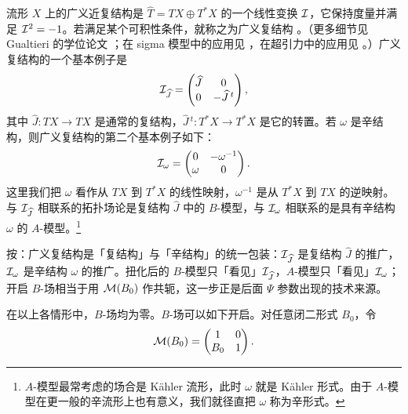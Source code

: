流形 $X$ 上的广义近复结构是 $\widehat T=TX\oplus T^*X$ 的一个线性变换 ${\cal I}$，它保持度量并满足 ${\cal I}^2=-1$。若满足某个可积性条件，就称之为广义复结构 \cite{ref69}。（更多细节见 Gualtieri 的学位论文 \cite{ref67}；在 sigma 模型中的应用见 \cite{ref71,ref72,ref73,ref74,ref68}，在超引力中的应用见 \cite{ref75,ref76,ref77}。）广义复结构的一个基本例子是 %
\setcounter{equation}{22}
\begin{equation}\label{eq:momo}
{\cal I}_{\hat J}=\left(\begin{matrix} {\hat J} &
0 \\ 0 & -{\hat J}\,^t\\\end{matrix}\right),
\end{equation}
其中 ${\hat J}:TX\to TX$ 是通常的复结构，${\hat J}\,^t:T^*X\to T^*X$ 是它的转置。若 $\omega$ 是辛结构，则广义复结构的第二个基本例子如下：
\setcounter{equation}{23}
\begin{equation}\label{eq:zomo}
{\cal I}_\omega=\left(\begin{matrix}0 & -\omega^{-1}\\ \omega
& 0\\\end{matrix}\right).
\end{equation}
这里我们把 $\omega$ 看作从 $TX$ 到 $T^*X$ 的线性映射，$\omega^{-1}$ 是从 $T^*X$ 到 $TX$ 的逆映射。与 ${\cal I}_{\hat J}$ 相联系的拓扑场论是复结构 ${\hat J}$ 中的 $B$-模型，与 ${\cal I}_\omega$ 相联系的是具有辛结构 $\omega$ 的 $A$-模型。\footnote{$A$-模型最常考虑的场合是 Kähler 流形，此时 $\omega$ 就是 Kähler 形式。由于 $A$-模型在更一般的辛流形上也有意义，我们就径直把 $\omega$ 称为辛形式。}

\begin{yizhu}[物理图像]
按：广义复结构是「复结构」与「辛结构」的统一包装：${\cal I}_{\hat J}$ 是复结构 $\hat J$ 的推广，${\cal I}_\omega$ 是辛结构 $\omega$ 的推广。扭化后的 $B$-模型只「看见」${\cal I}_{\hat J}$，$A$-模型只「看见」${\cal I}_\omega$；开启 $B$-场相当于用 ${\cal M}(B_0)$ 作共轭，这一步正是后面 $\Psi$ 参数出现的技术来源。
\end{yizhu}

在以上各情形中，$B$-场均为零。$B$-场可以如下开启。对任意闭二形式 $B_0$，令
\setcounter{equation}{24}
\begin{equation}\label{eq:hyt}
{\cal M}(B_0)=\left(\begin{matrix}1 & 0 \\
                                   B_0 & 1 \\\end{matrix}\right).
\end{equation}

